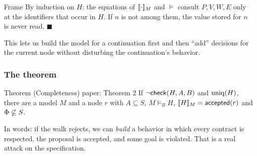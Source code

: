 \begin{plainproof}{Frame}
By induction on $H$: the equations of $\llbracket \cdot\rrbracket_{M}$ and $\models$ consult $P,V,W,E$ only at the identifiers that occur in $H$. If $n$ is not among them, the value stored for $n$ is never read. \hfill$\blacksquare$
\end{plainproof}

This lets us build the model for a continuation first and then ``add'' decisions for the current node without disturbing the continuation's behavior.

\subsubsection{The theorem}

\begin{statement}{Theorem (Completeness) \hfill\normalfont paper: Theorem 2}
If $\neg\mathsf{check}(H,A,B)$ and $\mathrm{uniq}(H)$, there are a model $M$ and a node $r$ with $A\subseteq S$, $M\models_B H$, $\llbracket H\rrbracket_{M}=\mathsf{accepted}(r)$ and $\Phi\not\subseteq S$.
\end{statement}

In words: if the walk rejects, we can \emph{build} a behavior in which every contract is respected, the proposal is accepted, and some goal is violated. That is a real attack on the specification.

